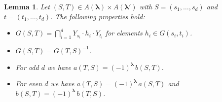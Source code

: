 \documentclass[12pt, reqno]{amsart}
\newtheorem{lemma}[theorem]{Lemma}
\theoremstyle{definition}
\begin{document}
\begin{lemma}\label{lemma:ats}
	Let $(S, T) \in A(\pmb{\lambda}) \times A(\pmb{\lambda'})$ with $S = (s_1,\ldots,s_d)$ and $t = (t_1,\ldots,t_d)$. 
	The following properties hold:
	\begin{itemize}
		\item[(a)] $G(S,T) = \bigcap_{i=1}^d Y_{s_i} \cdot h_i \cdot Y_{t_i}$  for elements $h_i \in G(s_i, t_i)$.
		\item[(b)] $G(S,T) = G(T,S)^{-1}$.
		\item[(c)] For odd $d$ we have $a(T,S) = (-1)^{\pmb{\lambda}}\, b(S,T)$.
		\item[(d)] For even $d$ we have $a(T,S) = (-1)^{\pmb{\lambda}}\, a(S,T)$ and $b(S,T) = (-1)^{\pmb{\lambda}}\, b(T,S)$.
	\end{itemize}	 
\end{lemma}
\end{document}
